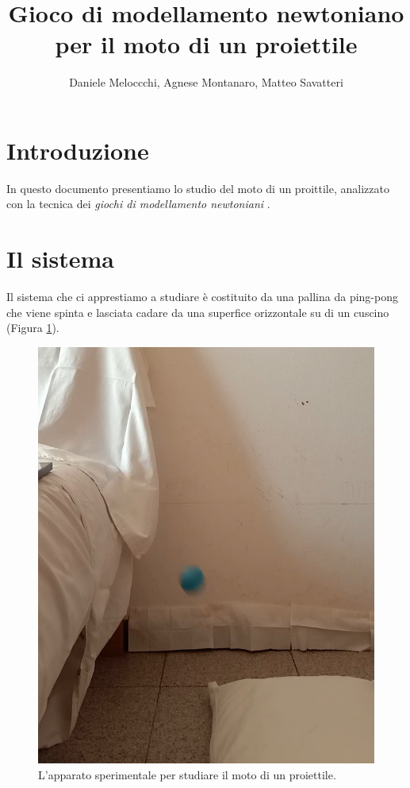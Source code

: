 \documentclass{article}
\title{Gioco di modellamento newtoniano per il moto di un proiettile}
\author{Daniele Meloccchi, Agnese Montanaro, Matteo Savatteri}
\begin{document}
\maketitle

\tableofcontents

\section{Introduzione}
In questo documento presentiamo lo studio del moto di un
proittile, analizzato con la tecnica dei \emph{giochi di modellamento newtoniani}
\cite{hestenes1992modeling}.

\section{Il sistema}
Il sistema che ci apprestiamo a studiare è costituito da una pallina da
ping-pong che viene spinta e lasciata cadare da una superfice orizzontale
su di un cuscino (Figura \ref{fig:setup_proiettile}).

\begin{figure}
\centering
  \includegraphics[width=\textwidth]{setup_proiettile}
  \caption{L'apparato sperimentale per studiare il moto di un proiettile.}
  \label{fig:setup_proiettile}
\end{figure}
\end{document}
